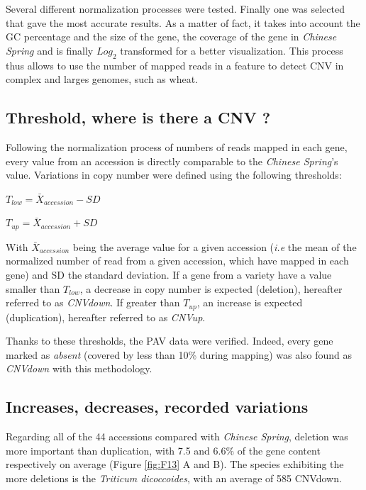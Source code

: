\documentclass[a4paper, 12pt]{article}
\begin{document}
\begin{onehalfspace}
Several different normalization processes were tested. Finally one was selected that gave the most accurate results. As a matter of fact, it takes into account the GC percentage and the size of the gene, the coverage of the gene in \textit{Chinese Spring} and is finally $Log_{2}$ transformed for a better visualization. This process thus allows to use the number of mapped reads in a feature to detect CNV in complex and larges genomes, such as wheat.
    
        \subsection{Threshold, where is there a CNV ?}

Following the normalization process of numbers of reads mapped in each gene, every value from an accession is directly comparable to the \textit{Chinese Spring}'s value. Variations in copy number were defined using the following thresholds:

\vspace{0.5cm}
$T_{low} = \bar{X}_{accession} - SD$ 
\vspace{0.5cm}

$T_{up} = \bar{X}_{accession} + SD$
\vspace{0.5cm}

With $\bar{X}_{accession}$ being the average value for a given accession (\textit{i.e} the mean of the normalized number of read from a given accession, which have mapped in each gene) and SD the standard deviation. If a gene from a variety have a value smaller than $T_{low}$, a decrease in copy number is expected (deletion), hereafter referred to as \textit{CNVdown}. If greater than $T_{up}$, an increase is expected (duplication), hereafter referred to as \textit{CNVup}.

Thanks to these thresholds, the PAV data were verified. Indeed, every gene marked as \textit{absent} (covered by less than 10\% during mapping) was also found as \textit{CNVdown} with this methodology.

        \subsection{Increases, decreases, recorded variations}
        
Regarding all of the 44 accessions compared with \textit{Chinese Spring}, deletion was more important than duplication, with 7.5 and 6.6\% of the gene content respectively on average (Figure \ref{fig:F13} A and B). The species exhibiting the more deletions is the \textit{Triticum dicoccoides}, with an average of 585 CNVdown. 


\end{onehalfspace}
\end{document}
